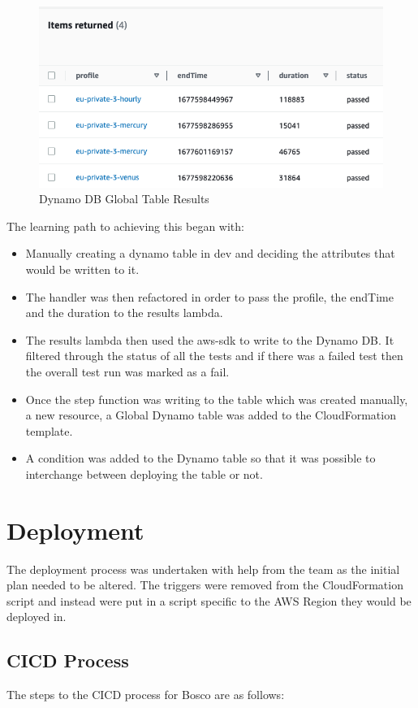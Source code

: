 \documentclass[12pt,a4paper,titlepage]{report}
\begin{document}
\begin{figure}[ht]
  \centering
  \includegraphics[width=15cm]{./diagrams/dynamodb.png}
  \caption{Dynamo DB Global Table Results}
 \end{figure}

The learning path to achieving this began with:
\begin{itemize}
\item Manually creating a dynamo table in dev and deciding the attributes that would be written to it.
\item The handler was then refactored in order to pass the profile, the endTime and the duration to the results lambda.
\item The results lambda then used the aws-sdk to write to the Dynamo DB. It filtered through the status of all the tests and if there was a failed test then the overall test run was marked as a fail.
\item Once the step function was writing to the table which was created manually, a new resource, a Global Dynamo table was added to the  CloudFormation template.
\item A condition was added to the Dynamo table so that it was possible to interchange between deploying the table or not.
\end{itemize}

\chapter{Deployment}
The deployment process was undertaken with help from the team as the initial plan needed to be altered. The triggers were removed from the 
 CloudFormation script and instead were put in a script specific to the AWS Region they would be deployed in. 

\section{CICD Process}
The steps to the CICD process for Bosco are as follows:
\end{document}

